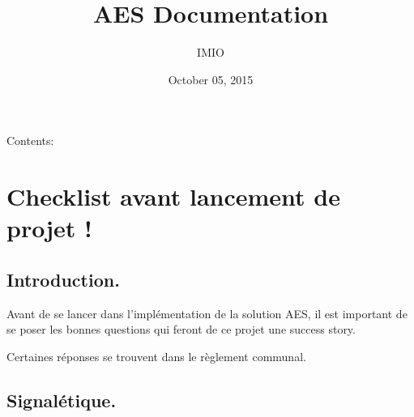 \documentclass[letterpaper,10pt,english]{sphinxmanual}
\title{AES Documentation}
\date{October 05, 2015}
\author{IMIO}
\begin{document}
\maketitle
\tableofcontents
{}\label{index::doc}


Contents:


\chapter{Checklist avant lancement de projet !}
\label{checklist::doc}\label{checklist:checklist-avant-lancement-de-projet}\label{checklist:welcome-to-aes-s-documentation}

\section{Introduction.}
\label{checklist:introduction}
Avant de se lancer dans l'implémentation de la solution AES, il est important de se poser les bonnes questions qui feront de ce projet une success story.

Certaines réponses se trouvent dans le règlement communal.


\section{Signalétique.}
\label{checklist:signaletique}
\end{document}
